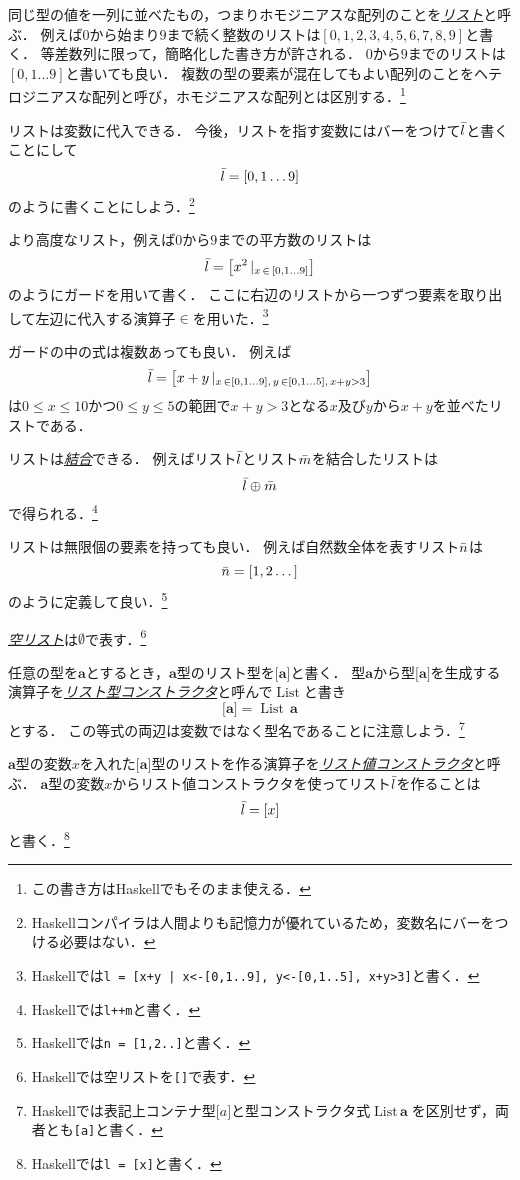 \documentclass[twocolumn]{jsbook}
\newcommand{\keyword}[1]{\underline{\emph{#1}}}
\newcommand{\code}[1]{\texttt{#1}}
\newcommand{\hsklType}[1]{\textbf{#1}}
\newcommand{\hsklTypeConstructor}[1]{\mathop{\mathrm{#1}}}
\DeclareMathOperator{\hsklListConstructor}{\hsklTypeConstructor{List}}
\newcommand{\hsklAppend}{\oplus}
\newcommand{\hsklEmptyList}{\emptyset}
\newcommand{\hsklList}[1]{\Bar{#1}}
\newcommand{\hsklListType}[1]{\boldsymbol{[}#1\boldsymbol{]}}
\newcommand{\hsklTypeConstruct}[2]{#1\,#2}
\DeclareMathOperator{\mathFrom}{\in}
\newcommand{\mathGuard}[1]{\mathop{\mid_{#1}}}
\begin{document}
同じ型の値を一列に並べたもの，つまりホモジニアスな配列のことを\keyword{リスト}と呼ぶ．
例えば$0$から始まり$9$まで続く整数のリストは$[0,1,2,3,4,5,6,7,8,9]$と書く．
等差数列に限って，簡略化した書き方が許される．
$0$から$9$までのリストは$[0,1\dots9]$と書いても良い．
複数の型の要素が混在してもよい配列のことをヘテロジニアスな配列と呼び，ホモジニアスな配列とは区別する．\footnote{この書き方はHaskellでもそのまま使える．}

リストは変数に代入できる．
今後，リストを指す変数にはバーをつけて$\hsklList{l}$と書くことにして$$\hsklList{l}=[0,1\dots9]$$のように書くことにしよう．\footnote{Haskellコンパイラは人間よりも記憶力が優れているため，変数名にバーをつける必要はない．}

より高度なリスト，例えば$0$から$9$までの平方数のリストは$$\hsklList{l}=\left[x^2\mathGuard{x\mathFrom{[0,1\dots9]}}\right]$$のようにガードを用いて書く．
ここに右辺のリストから一つずつ要素を取り出して左辺に代入する演算子$\mathFrom$を用いた．\footnote{Haskellでは\code{l = [x+y | x<-[0,1..9], y<-[0,1..5], x+y>3]}と書く．}

ガードの中の式は複数あっても良い．
例えば$$\hsklList{l}=\left[x+y\mathGuard{x\mathFrom[0,1\dots9],\,y\mathFrom[0,1\dots5],\,x+y>3}\right]$$は$0\le x\le 10$かつ$0\le y\le 5$の範囲で$x+y>3$となる$x$及び$y$から$x+y$を並べたリストである．

リストは\keyword{結合}できる．
例えばリスト$\hsklList{l}$とリスト$\hsklList{m}$を結合したリストは$$\hsklList{l}\hsklAppend\hsklList{m}$$で得られる．\footnote{Haskellでは\code{l++m}と書く．}

リストは無限個の要素を持っても良い．
例えば自然数全体を表すリスト$\hsklList{n}$は$$\hsklList{n}=[1,2\dots]$$のように定義して良い．\footnote{Haskellでは\code{n = [1,2..]}と書く．}

\keyword{空リスト}は$\hsklEmptyList$で表す．\footnote{Haskellでは空リストを\code{[]}で表す．}

任意の型を$\hsklType{a}$とするとき，$\hsklType{a}$型のリスト型を$\hsklListType{\hsklType{a}}$と書く．
型$\hsklType{a}$から型$\hsklListType{\hsklType{a}}$を生成する演算子を\keyword{リスト型コンストラクタ}と呼んで$\hsklListConstructor$と書き$$\hsklListType{\hsklType{a}}=\hsklTypeConstruct{\hsklListConstructor}{\hsklType{a}}$$とする．
この等式の両辺は変数ではなく型名であることに注意しよう．\footnote{Haskellでは表記上コンテナ型$\hsklListType{a}$と型コンストラクタ式$\hsklTypeConstruct{\hsklListConstructor}{\hsklType{a}}$を区別せず，両者とも\code{[a]}と書く．}

$\hsklType{a}$型の変数$x$を入れた$\hsklListType{\hsklType{a}}$型のリストを作る演算子を\keyword{リスト値コンストラクタ}と呼ぶ．
$\hsklType{a}$型の変数$x$からリスト値コンストラクタを使ってリスト$\hsklList{l}$を作ることは$$\hsklList{l}=[x]$$と書く．\footnote{Haskellでは\code{l = [x]}と書く．}
\end{document}
